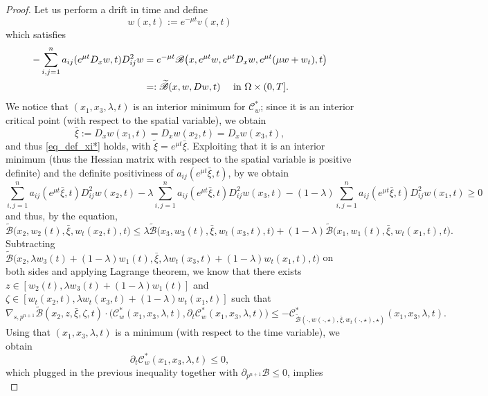 \documentclass[11pt, reqno]{amsart}
\theoremstyle{definition}
\numberwithin{equation}{section}
\newcommand{\Btilde}{\widetilde{\mathscr{B}}}
\newcommand{\mc}[1]{\mathcal{#1}}
\begin{document}
\begin{proof}
Let us perform a drift in time and define 
\begin{equation}\label{eq_drift_trick}
w(x,t):= e^{-\mu t} v(x,t)
\end{equation}
which satisfies
\begin{align*}
 - \sum_{i,j=1}^n a_{ij}(e^{\mu t} D_x w, t) D^2_{ij} w 
 &= e^{-\mu t} \mathscr{B}\big(x, e^{\mu t} w, e^{\mu t} D_x w, e^{\mu t} (\mu w + w_t), t\big) \\
&=: \Btilde(x,w, D w, t) \quad \hbox{ in $\Omega \times (0,T]$.}
\end{align*}
We notice that $(x_1,x_3,\lambda, t)$ is an interior minimum for $\mc{C}^*_w$; since it is an interior critical point (with respect to the spatial variable), we obtain
$$\bar{\xi} := D_x w(x_1,t)=D_x w(x_2,t)=D_x w(x_3,t),$$
and thus \eqref{eq_def_xi*} holds, with $\tilde{\xi} = e^{\mu t} \bar{\xi}$. 
Exploiting that it is an interior minimum (thus the Hessian matrix with respect to the spatial variable is positive definite) and the definite positiviness of $a_{ij}(e^{\mu t} \bar{\xi}, t)$, by \cite[Lemma A.1]{kennington} we obtain 
$$\sum_{i,j=1}^n a_{ij}(e^{\mu t}\bar{\xi}, t) D^2_{ij} w(x_2, t) - \lambda \sum_{i,j=1}^n a_{ij}(e^{\mu t}\bar{\xi}, t) D^2_{ij} w(x_3, t) - (1-\lambda) \sum_{i,j=1}^n a_{ij}(e^{\mu t} \bar{\xi}, t) D^2_{ij} w(x_1, t) \geq 0$$
and thus, by the equation,
$$\Btilde\big(x_2, w_2(t), \bar{\xi}, w_t(x_2,t), t\big) \leq \lambda \Btilde\big(x_3, w_3(t), \bar{\xi}, w_t(x_3,t), t\big)+ (1-\lambda)\Btilde\big(x_1, w_1(t),\bar{\xi}, w_t(x_1,t), t\big) .$$
Subtracting $\Btilde\big(x_2, \lambda w_3(t)+(1-\lambda)w_1(t), \bar{\xi}, \lambda w_t(x_3,t) + (1-\lambda) w_t(x_1,t), t\big)$ on both sides and applying Lagrange theorem, we know that there exists $z\in [w_2(t),\lambda w_3(t)+(1-\lambda)w_1(t)]$ and $\zeta \in [w_t(x_2,t), \lambda w_t(x_3,t) + (1-\lambda) w_t(x_1,t)]$ such that
\begin{equation*}
\nabla_{s,p^{n+1}}\Btilde(x_2, z, \bar{\xi}, \zeta, t) \cdot \big(\mc{C}^*_w(x_1,x_3,\lambda,t), \partial_t \mc{C}^*_w(x_1,x_3,\lambda, t)\big) \leq - \mc{C}^*_{\Btilde(\cdot, w(\cdot, \star), \bar{\xi}, w_t(\cdot, \star), \star)} (x_1, x_3, \lambda, t).
\end{equation*}
Using that $(x_1,x_3,\lambda, t)$  is a minimum (with respect to the time variable), we obtain
$$\partial_t \mc{C}^*_w(x_1,x_3, \lambda, t) \leq 0,$$
which plugged in the previous inequality together with $\partial_{p^{n+1}} \mathscr{B} \leq 0$, implies 
\begin{equation*}

\end{equation*}
\end{proof}
\end{document}
